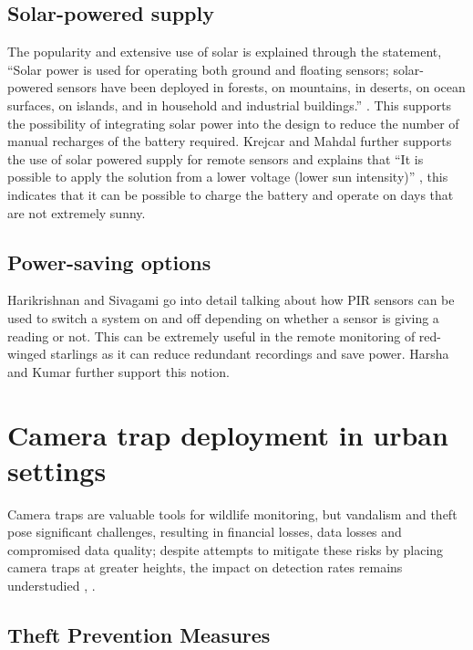 \documentclass[class=report,11pt,crop=false]{standalone}
\begin{document}
\subsection{Solar-powered supply}

The popularity and extensive use of solar is explained through the statement, “Solar power is used for operating both ground and floating sensors; solar-powered sensors have been deployed in forests, on mountains, in deserts, on ocean surfaces, on islands, and in household and industrial buildings.” \cite{dewan2014alternative}. This supports the possibility of integrating solar power into the design to reduce the number of manual recharges of the battery required. Krejcar and Mahdal further supports the use of solar powered supply for remote sensors and explains that “It is possible to apply the solution from a lower voltage (lower sun intensity)” \cite{krejcar2012optimized}, this indicates that it can be possible to charge the battery and operate on days that are not extremely sunny.

\subsection{Power-saving options}


Harikrishnan and Sivagami \cite{harikirshnan2017intelligent} go into detail talking about how PIR sensors can be used to switch a system on and off depending on whether a sensor is giving a reading or not. This can be extremely useful in the remote monitoring of red-winged starlings as it can reduce redundant recordings and save power. Harsha and Kumar \cite{harsha2020home} further support this notion.


\section{Camera trap deployment in urban settings} 

Camera traps are valuable tools for wildlife monitoring, but vandalism and theft pose significant challenges, resulting in financial losses, data losses and compromised data quality; despite attempts to mitigate these risks by placing camera traps at greater heights, the impact on detection rates remains understudied \cite{meek2016higher}, \cite{meek2019camera}.


\subsection{Theft Prevention Measures} 
\end{document}
